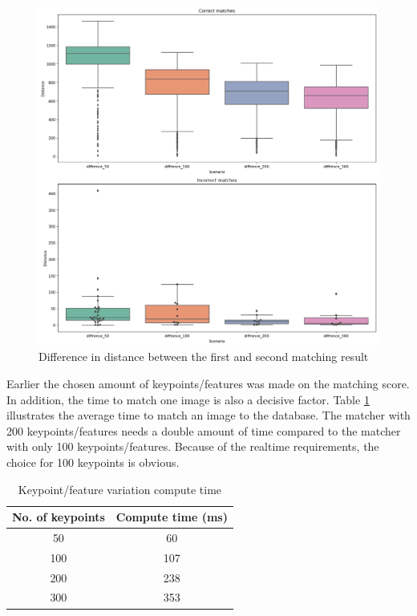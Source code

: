 \begin{figure}[htbp]
    \includegraphics[width=1.0\columnwidth]{images/bxplt_difference_keypoints.png}
    \centering
    \caption{Difference in distance between the first and second matching result}
    \label{fig:bxplt_difference_keypoints}
\end{figure}

Earlier the chosen amount of keypoints/features was made on the matching score. In addition, the time to match one image is also a decisive factor. Table \ref{tab:keypoint_timing} illustrates the average time to match an image to the database. The matcher with 200 keypoints/features needs a double amount of time compared to the matcher with only 100 keypoints/features. Because of the realtime requirements, the choice for 100 keypoints is obvious.

\renewcommand{\arraystretch}{1.2}
\begin{table}[htbp]
    \caption{Keypoint/feature variation compute time}
    \centering
    \begin{center}
        \begin{tabular}{ |c|c|  }
         \hline
         No. of keypoints& Compute time (ms)\\
         \hline \hline
         50  & 60 \\
         \hline
         100 & 107 \\
         \hline
         200 & 238 \\
         \hline
         300 & 353 \\
         \hline
        \end{tabular}
    \end{center}
    \label{tab:keypoint_timing}
\end{table}

